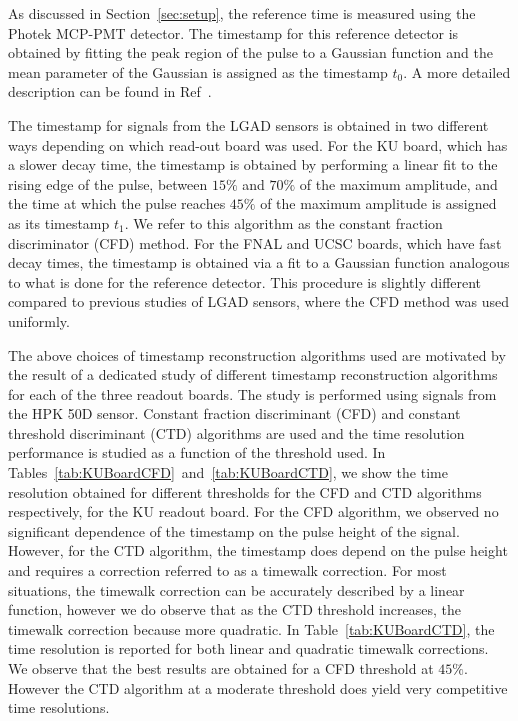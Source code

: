 \documentclass[preprint,1p]{elsarticle}
\begin{document}
As discussed in Section~\ref{sec:setup}, the reference time
is measured using the Photek MCP-PMT detector. The timestamp
for this reference detector is obtained by fitting the 
peak region of the pulse to a Gaussian function and the
mean parameter of the Gaussian is assigned as the timestamp $t_0$. 
A more detailed description can be found in Ref~\cite{Anderson:2015gha}.

The timestamp for signals from the LGAD sensors is obtained in two different ways depending on
which read-out board was used. For the KU board, which has a slower decay time,
the timestamp is obtained by performing a linear fit to the
rising edge of the pulse, between $15\%$ and $70\%$ of the maximum amplitude, 
and the time at which the pulse reaches $45\%$ of the
maximum amplitude is assigned as its timestamp $t_1$. We refer to this algorithm as the
constant fraction discriminator (CFD) method. For the FNAL and UCSC boards,
which have fast decay times, the timestamp is obtained via a fit to a 
Gaussian function analogous to what is done for the reference detector.
This procedure is slightly different compared to previous studies of LGAD sensors, 
where the CFD method was used uniformly.

The above choices of timestamp reconstruction algorithms used
are motivated by the result of a dedicated study of different
timestamp reconstruction algorithms for each of the three readout boards.
The study is performed using signals from the HPK 50D sensor. 
Constant fraction discriminant (CFD) and constant threshold discriminant (CTD)
algorithms are used and the time resolution performance is studied as a function
of the threshold used. In Tables~\ref{tab:KUBoardCFD}~and~\ref{tab:KUBoardCTD}, 
we show the time resolution obtained
for different thresholds for the CFD and CTD algorithms respectively, for the KU
readout board. For the CFD algorithm, we observed no significant dependence of
the timestamp on the pulse height of the signal. However, for the CTD algorithm, 
the timestamp does depend on the pulse height and requires a 
correction referred to as a timewalk correction. 
For most situations, the timewalk correction can be accurately described by a linear
function, however we do observe that as the CTD threshold increases, the timewalk
correction because more quadratic. In Table~\ref{tab:KUBoardCTD}, the time resolution 
is reported for both linear and quadratic timewalk corrections.
We observe that the best results are obtained for a CFD threshold
at $45\%$. However the CTD algorithm at a moderate threshold does yield very competitive
time resolutions. 
\end{document}
